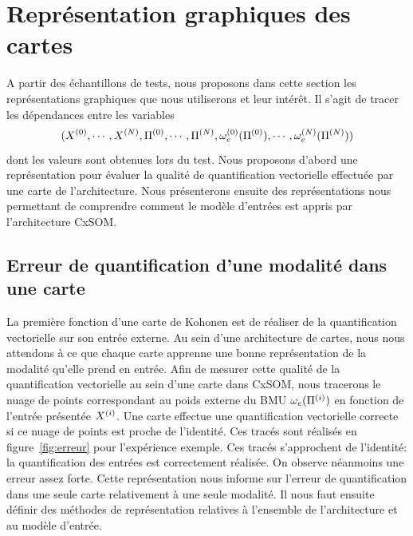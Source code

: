 \section{Représentation graphiques des cartes}

A partir des échantillons de tests, nous proposons dans cette section les représentations graphiques que nous utiliserons et leur intérêt.
Il s'agit de tracer les dépendances entre les variables $$(X^{({0})}, \cdots, X^{({N})}, \Pi^{({0})}, \cdots, \Pi^{({N})}, \omega_e^{({0})}(\Pi^{({0})}), \cdots, \omega_e^{({N})}(\Pi^{({N})}))$$ dont les valeurs sont obtenues lors du test.
Nous proposons d'abord une représentation pour évaluer la qualité de quantification vectorielle effectuée par une carte de l'architecture. Nous présenterons ensuite des représentations nous permettant de comprendre comment le modèle d'entrées est appris par l'architecture CxSOM.
\subsection{Erreur de quantification d'une modalité dans une carte}

La première fonction d'une carte de Kohonen est de réaliser de la quantification vectorielle sur son entrée externe. Au sein d'une architecture de cartes, nous nous attendons à ce que chaque carte apprenne une bonne représentation de la modalité qu'elle prend en entrée.
Afin de mesurer cette qualité de la quantification vectorielle au sein d'une carte dans CxSOM, nous tracerons le nuage de points correspondant au poids externe du BMU $\omega_e(\Pi^{({i})})$ en fonction de l'entrée présentée $X^{({i})}$. Une carte effectue une quantification vectorielle correcte si ce nuage de points est proche de l'identité.
Ces tracés sont réalisés en figure~\ref{fig:erreur} pour l'expérience exemple. Ces tracés s'approchent de l'identité: la quantification des entrées est correctement réalisée. On observe néanmoins une erreur assez forte.
Cette représentation nous informe sur l'erreur de quantification dans une seule carte relativement à une seule modalité. Il nous faut ensuite définir des méthodes de représentation relatives à l'ensemble de l'architecture et au modèle d'entrée.

